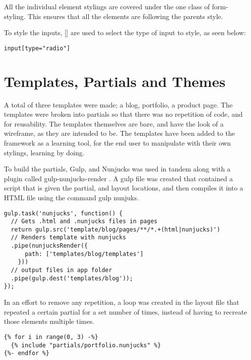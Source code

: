 All the individual element stylings are covered under the one class of form-styling. This ensures that all the elements are following the parents style. 

To style the inputs, [] are used to select the type of input to style, as seen below: 

\begin{lstlisting}[language=CSS3]
input[type="radio"]
\end{lstlisting}

\newpage
{}
\section*{Templates, Partials and Themes}

A total of three templates were made; a blog, portfolio, a product page. The templates were broken into partials so that there was no repetition of code, and for reusability. The templates themselves are bare, and have the look of a wireframe, as they are intended to be. The templates have been added to the framework as a learning tool, for the end user to manipulate with their own stylings, learning by doing. 

To build the partials, Gulp, and Nunjucks was used in tandem along with a plugin called gulp-nunjucks-render \citep*{PLUG17} . A gulp file was created that contained a script that is given the partial, and layout locations, and then compiles it into a \gls{HTML} file using the command gulp nunjuks.

\begin{lstlisting}[language=CSS3]
gulp.task('nunjucks', function() {
  // Gets .html and .nunjucks files in pages
  return gulp.src('template/blog/pages/**/*.+(html|nunjucks)')
  // Renders template with nunjucks
  .pipe(nunjucksRender({
      path: ['templates/blog/templates']
    }))
  // output files in app folder
  .pipe(gulp.dest('templates/blog'));
});

\end{lstlisting}

In an effort to remove any repetition, a loop was created in the layout file that repeated a certain partial for a set number of times, instead of having to recreate those elements multiple times. 

\begin{lstlisting}[language=CSS3]
{% for i in range(0, 3) -%}
  {% include "partials/portfolio.nunjucks" %}
{%- endfor %}
\end{lstlisting}

